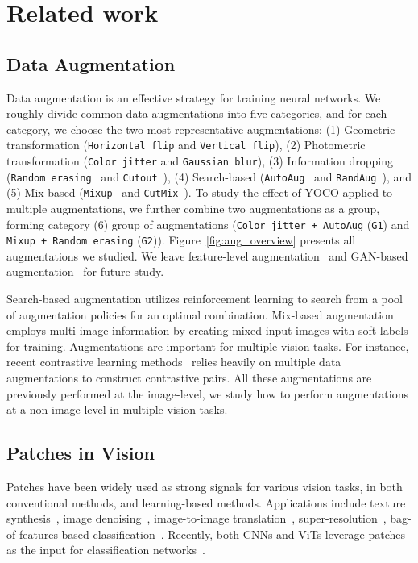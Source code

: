 \documentclass{article}
\begin{document}
\section{Related work}

\subsection{Data Augmentation}
Data augmentation is an effective strategy for training neural networks. We roughly divide common data augmentations into five categories, and for each category, we choose the two most representative augmentations: (1) Geometric transformation (\texttt{Horizontal flip} and \texttt{Vertical flip}), (2) Photometric transformation (\texttt{Color jitter} and \texttt{Gaussian blur}), (3) Information dropping (\texttt{Random erasing}~\cite{zhong2020random} and \texttt{Cutout}~\cite{devries2017improved}), (4) Search-based (\texttt{AutoAug}~\cite{cubuk2018autoaugment} and \texttt{RandAug}~\cite{cubuk2020randaugment}), and (5) Mix-based (\texttt{Mixup}~\cite{zhang2017mixup} and \texttt{CutMix}~\cite{yun2019CutMix}). 
To study the effect of YOCO applied to multiple augmentations, we further combine two augmentations as a group, forming category (6) group of augmentations (\texttt{Color jitter + AutoAug} (\texttt{G1}) and \texttt{Mixup + Random erasing} (\texttt{G2})). 
Figure~\ref{fig:aug_overview} presents all augmentations we studied. We leave feature-level augmentation~\cite{upchurch2017deep, wang2021regularizing} and GAN-based augmentation~\cite{bowles2018gan} for future study.

Search-based augmentation utilizes reinforcement learning to search from a pool of augmentation policies for an optimal combination. Mix-based augmentation employs multi-image information by creating mixed input images with soft labels for training. Augmentations are important for multiple vision tasks. For instance, recent contrastive learning methods~\cite{he2020momentum,chen2020simple,chen2020improved,chen2021exploring} relies heavily on multiple data augmentations to construct contrastive pairs.
All these augmentations are previously performed at the image-level, we study how to perform augmentations at a non-image level in multiple vision tasks.

\subsection{Patches in Vision}
Patches have been widely used as strong signals for various vision tasks, in both conventional methods, and learning-based methods. Applications include texture synthesis~\cite{efros1999texture}, image denoising~\cite{kervrann2006optimal}, image-to-image translation~\cite{park2020contrastive,han2021dcl}, super-resolution~\cite{shocher2018zero}, bag-of-features based classification~\cite{sivic2003video,csurka2004visual,lazebnik2006beyond}. Recently, both CNNs and ViTs leverage patches as the input for classification networks~\cite{brendel2019approximating,dosovitskiy2020image}. 
\end{document}
